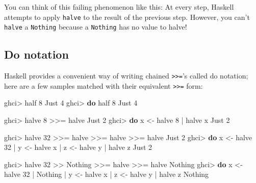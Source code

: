 \documentclass[]{article}
\newenvironment{Shaded}{}{}
\newcommand{\DataTypeTok}[1]{\textcolor[rgb]{0.56,0.13,0.00}{#1}}
\newcommand{\DecValTok}[1]{\textcolor[rgb]{0.25,0.63,0.44}{#1}}
\newcommand{\KeywordTok}[1]{\textcolor[rgb]{0.00,0.44,0.13}{\textbf{#1}}}
\newcommand{\NormalTok}[1]{#1}
\newcommand{\OperatorTok}[1]{\textcolor[rgb]{0.40,0.40,0.40}{#1}}
\newcommand{\OtherTok}[1]{\textcolor[rgb]{0.00,0.44,0.13}{#1}}
\begin{document}
You can think of this failing phenomenon like this: At every step, Haskell
attempts to apply \texttt{halve} to the result of the previous step. However,
you can't \texttt{halve} a \texttt{Nothing} because a \texttt{Nothing} has no
value to halve!

\hypertarget{do-notation}{%
\subsection{Do notation}\label{do-notation}}

Haskell provides a convenient way of writing chained
\texttt{\textgreater{}\textgreater{}=}'s called do notation; here are a few
samples matched with their equivalent \texttt{\textgreater{}\textgreater{}=}
form:

\begin{Shaded}
\begin{Highlighting}[]
\NormalTok{ghci}\OperatorTok{>}\NormalTok{ half }\DecValTok{8}
\DataTypeTok{Just} \DecValTok{4}
\NormalTok{ghci}\OperatorTok{>} \KeywordTok{do}\NormalTok{  half }\DecValTok{8}
\DataTypeTok{Just} \DecValTok{4}

\NormalTok{ghci}\OperatorTok{>}\NormalTok{ halve }\DecValTok{8} \OperatorTok{>>=}\NormalTok{ halve}
\DataTypeTok{Just} \DecValTok{2}
\NormalTok{ghci}\OperatorTok{>} \KeywordTok{do}\NormalTok{  x }\OtherTok{<{-}}\NormalTok{ halve }\DecValTok{8}
    \OperatorTok{|}\NormalTok{     halve x}
\DataTypeTok{Just} \DecValTok{2}

\NormalTok{ghci}\OperatorTok{>}\NormalTok{ halve }\DecValTok{32} \OperatorTok{>>=}\NormalTok{ halve }\OperatorTok{>>=}\NormalTok{ halve }\OperatorTok{>>=}\NormalTok{ halve}
\DataTypeTok{Just} \DecValTok{2}
\NormalTok{ghci}\OperatorTok{>} \KeywordTok{do}\NormalTok{  x }\OtherTok{<{-}}\NormalTok{ halve }\DecValTok{32}
    \OperatorTok{|}\NormalTok{     y }\OtherTok{<{-}}\NormalTok{ halve x}
    \OperatorTok{|}\NormalTok{     z }\OtherTok{<{-}}\NormalTok{ halve y}
    \OperatorTok{|}\NormalTok{     halve z}
\DataTypeTok{Just} \DecValTok{2}

\NormalTok{ghci}\OperatorTok{>}\NormalTok{ halve }\DecValTok{32} \OperatorTok{>>} \DataTypeTok{Nothing} \OperatorTok{>>=}\NormalTok{ halve }\OperatorTok{>>=}\NormalTok{ halve}
\DataTypeTok{Nothing}
\NormalTok{ghci}\OperatorTok{>} \KeywordTok{do}\NormalTok{  x }\OtherTok{<{-}}\NormalTok{ halve }\DecValTok{32}
    \OperatorTok{|}     \DataTypeTok{Nothing}
    \OperatorTok{|}\NormalTok{     y }\OtherTok{<{-}}\NormalTok{ halve x}
    \OperatorTok{|}\NormalTok{     z }\OtherTok{<{-}}\NormalTok{ halve y}
    \OperatorTok{|}\NormalTok{     halve z}
\DataTypeTok{Nothing}
\end{Highlighting}
\end{Shaded}
\end{document}
